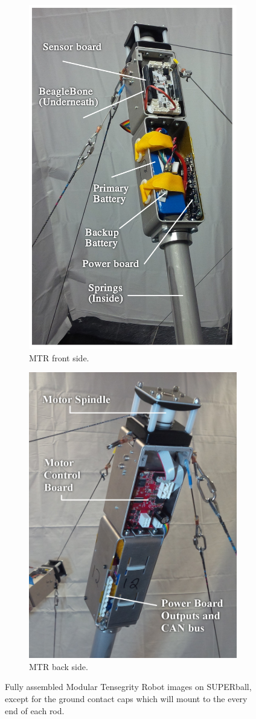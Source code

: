 \begin{figure}[thpb]
\begin{subfigure}{.5\textwidth}
      \centering
      \includegraphics[width=0.6\columnwidth]{tex/img/endcap_upclose_sensorboard_labelled_fixedfonts}
      \caption{MTR front side.}
      \label{fig:endcap_upclose_front}
\end{subfigure}
\begin{subfigure}{.5\textwidth}
      \centering
      \includegraphics[width=0.7\columnwidth]{tex/img/endcap_upclose_motorboard_labelled_fixedfonts}
      \caption{MTR back side.}
      \label{fig:endcap_upclose_back}
\end{subfigure}
\caption{Fully assembled Modular Tensegrity Robot images on SUPERball, except for the ground contact caps which will mount to the every end of each rod.}
\label{fig:fully_assembled_endcap}
\end{figure}

